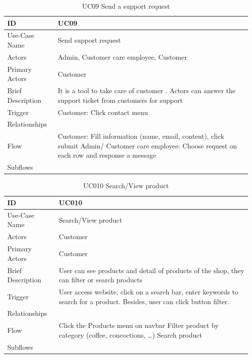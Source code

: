 \begin{table}
\begin{tabular}{|>{\raggedright\arraybackslash}p{5cm}|>{\raggedright\arraybackslash}p{10cm}|}
\hline
ID& UC09 \\
\hline
Use-Case Name& Send support request\\
\hline
Actors& Admin, Customer care employee, Customer\\
\hline
Primary Actors& Customer\\
\hline
Brief Description& It is a tool to take care of customer . Actors can answer the support ticket from customers for support\\
\hline
Trigger& Customer: Click contact menu\\
\hline
Relationships& \\
\hline
Flow& Customer: \break
Fill information (name, email, content), click submit\break
Admin/ Customer care employee:\break
Choose request on each row and response a message\\
\hline
Subflows& \\
\hline
\end{tabular}
\caption{UC09 Send a support request}
\label{tab:UC09}
\end{table}
\begin{table}
\begin{tabular}{|>{\raggedright\arraybackslash}p{5cm}|>{\raggedright\arraybackslash}p{10cm}|}
\hline
ID& UC010 \\
\hline
Use-Case Name& Search/View product\\
\hline
Actors& Customer \\
\hline
Primary Actors& Customer \\
\hline
Brief Description& User can see products and detail of products of the shop, they can filter or search products\\
\hline
Trigger& User access website, click on a search bar, enter keywords to search for a product. Besides, user can click button filter.\\
\hline
Relationships& \\
\hline
Flow& Click the Products menu on navbar \break
Filter product by category (coffee, concoctions, …) \break 
Search product\\
\hline
Subflows& \\
\hline
\end{tabular}
\caption{UC010 Search/View product}
\label{tab:UC010}
\end{table}
